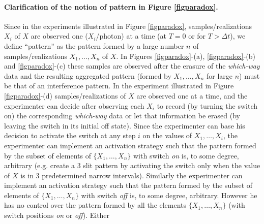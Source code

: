 \documentclass[11pt]{article}
\theoremstyle{definition}
\begin{document}
\paragraph{Clarification of the notion of pattern in Figure \ref{figparadox}.}
Since in the experiments illustrated in Figure \ref{figparadox}, samples/realizations $X_i$ of $X$ are observed one ($X_i$/photon) at a time (at $T=0$ or for $T>\Delta t$), we define  ``pattern'' as the pattern formed by a large number $n$ of samples/realizations $X_1,\ldots,X_n$ of $X$.
In Figures \ref{figparadox}-(a), \ref{figparadox}-(b) and \ref{figparadox}-(c) these samples are observed after the erasure of the \emph{which-way} data and the resulting aggregated pattern (formed by $X_1,\ldots,X_n$ for large $n$) must be that of an interference pattern.
In the experiment illustrated in Figure \ref{figparadox}-(d) samples/realizations of $X$ are observed one at a time, and the experimenter can decide after observing each  $X_i$ to record (by turning the switch on) the corresponding \emph{which-way} data or let that information be erased (by leaving the switch in its initial off state). Since the experimenter can base his decision to activate the switch at any step $i$ on the values of $X_1,\ldots,X_i$, the experimenter can implement an activation strategy such that the pattern formed by the subset of elements of $\{X_1,\ldots,X_n\}$ with switch \emph{on} is, to some degree, arbitrary (e.g. create a 3 slit pattern by activating the switch only when the value of $X$ is in 3 predetermined narrow intervals). Similarly the experimenter can implement an activation strategy such that the pattern formed by the subset of elements of $\{X_1,\ldots,X_n\}$ with switch \emph{off} is, to some degree, arbitrary. However he has no control over the pattern formed by all the elements $\{X_1,\ldots,X_n\}$ (with switch positions \emph{on} or \emph{off}).
Either
\end{document}
